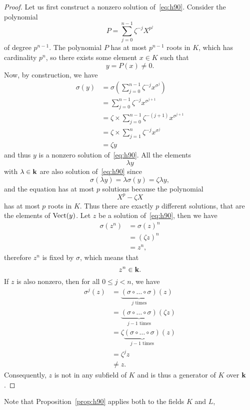 \begin{proof}
  Let us first construct a nonzero solution of~\eqref{eq:h90}. Consider the polynomial
  \[
    P = \sum_{j=0}^{n-1}\zeta^{-j} X^{p^j}
  \]
  of degree $p^{n-1}$. The polynomial $P$ has at most $p^{n-1}$ roots in $K$,
  which has cardinality $p^n$, so there exists some element $x\in K$ such that
  \[
    y = P(x)\neq0.
  \]
  Now, by construction, we have
  \begin{align*}
    \sigma(y) &= \sigma(\sum_{j=0}^{n-1}\zeta^{-j}x^{\sigma^{j}})\\
    &= \sum_{j=0}^{n-1}\zeta^{-j}x^{\sigma^{j+1}}\\
    &= \zeta \times \sum_{j=0}^{n-1}\zeta^{-(j+1)}x^{\sigma^{j+1}}\\
    &= \zeta \times \sum_{j=1}^{n}\zeta^{-j}x^{\sigma^{j}}\\
    &= \zeta y
  \end{align*}
  and thus $y$ is a nonzero solution of~\eqref{eq:h90}. All the elements
  \[
    \lambda y
  \]
  with $\lambda\in\mathbf{k}$ are also solution of~\eqref{eq:h90} since
  \[
    \sigma(\lambda y) = \lambda\sigma(y) = \zeta\lambda y,
  \]
  and the equation has at most $p$ solutions because the polynomial
  \[
    X^p - \zeta X
  \]
  has at most $p$ roots in $K$. Thus there are exactly $p$ different solutions,
  that are the elements of $\operatorname{Vect}(y)$. Let $z$ be a solution of~\eqref{eq:h90},
  then we have
  \begin{align*}
   \sigma(z^n) &= \sigma(z)^n\\
   &= (\zeta z)^n\\
   &= z^n,
  \end{align*}
  therefore $z^n$ is fixed by $\sigma$, which means that
  \[
    z^n\in\mathbf{k}.
  \]
  If $z$ is also nonzero, then for all $0\leq j<n$, we have
  \begin{align*}
    \sigma^j(z) &= \underbrace{(\sigma\circ\dots\circ\sigma)}_{j\text{ times}}(z)\\
    &= \underbrace{(\sigma\circ\dots\circ\sigma)}_{j-1\text{ times}}(\zeta z)\\
    &= \zeta\underbrace{(\sigma\circ\dots\circ\sigma)}_{j-1\text{ times}}(z)\\
    &= \zeta^j z\\
    &\neq z.
  \end{align*}
  Consequently, $z$ is not in any subfield of $K$ and is thus a generator of $K$
  over $\mathbf{k}$.
\end{proof}
Note that Proposition~\ref{prop:h90} applies both to the fields $K$ and $L$,
